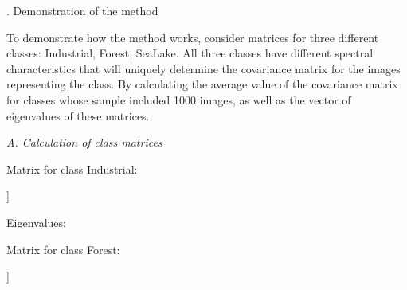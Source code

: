 \documentclass{article}
\begin{document}
\begin{multicols*}{2}
\begin{center}
    \uppercase\expandafter{}. Demonstration of the method 
\end{center}

\par To demonstrate how the method works, consider matrices for 
three different classes: Industrial, Forest, SeaLake. All 
three classes have different spectral characteristics that 
will uniquely determine the covariance matrix for the images 
representing the class. By calculating the average value of 
the covariance matrix for classes whose sample included 1000 
images, as well as the vector of eigenvalues of these matrices.
\vspace{10pt}

\noindent \textit{A. Calculation of class matrices} 
\vspace{5pt} 

\par Matrix for class Industrial: 
\par [[1 0.981 0.971 0.839 0.328 0.33 0.583 0.676] 
\par [0.981 1. 0.976 0.876 0.414 0.426 0.64 0.696] 
\par [0.971 0.976 1. 0.877 0.347 0.348 0.653 0.738]
\par [0.839 0.876 0.877 1. 0.549 0.45 0.823 0.823]
\par [0.328 0.414 0.347 0.549 1. 0.886 0.59 0.323]
\par [0.33 0.426 0.348 0.45 0.886 1. 0.504 0.255] 
\par [0.583 0.64 0.653 0.823 0.59 0.504 1. 0.903] 
\par [0.676 0.696 0.738 0.823 0.323 0.255 0.903 1. ]] 
\vspace{10pt}

\noindent Eigenvalues: 
\par [5.566 1.449 0.706 0.145 0.059 0.012 0.024 0.041] 
\vspace{10pt}

\noindent Matrix for class Forest: 
\par [[1. 0.878 0.907 0.853 0.724 0.75 0.841 0.854] 
\par [0.878 1. 0.907 0.888 0.805 0.856 0.861 0.863] 
\par [0.907 0.907 1. 0.917 0.738 0.731 0.882 0.907] 
\par [0.853 0.888 0.917 1. 0.888 0.793 0.972 0.976] 
\par [0.724 0.805 0.738 0.888 1. 0.898 0.901 0.857] 
\par [0.75 0.856 0.731 0.793 0.898 1. 0.794 0.755] 
\par [0.841 0.861 0.882 0.972 0.901 0.794 1. 0.992] 
\par [0.854 0.863 0.907 0.976 0.857 0.755 0.992 1. ]] 
\vspace{10pt}


\end{multicols*}
\end{document}
